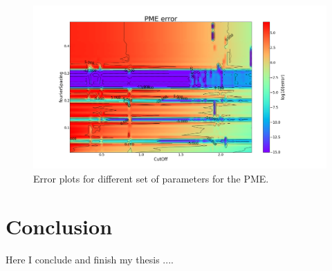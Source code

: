\documentclass[11pt,twoside,a4paper]{report}
\begin{document}
\begin{figure}[H]
	   \includegraphics[scale=0.3]{PME_error}
	    \centering 
    \caption{Error plots for different set of parameters for the PME.}    
   \end{figure}

\chapter{Conclusion}

Here I conclude and finish my thesis ....
	
	
	
	

\nocite{*}

 
\end{document}
